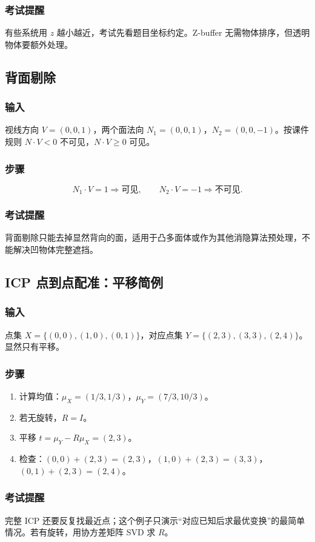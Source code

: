 \documentclass[UTF8,fontset=fandol,11pt]{ctexart}
\begin{document}
\subsubsection*{考试提醒}
有些系统用 $z$ 越小越近，考试先看题目坐标约定。Z-buffer 无需物体排序，但透明物体要额外处理。

\subsection{背面剔除}
\subsubsection*{输入}
视线方向 $V=(0,0,1)$，两个面法向 $N_1=(0,0,1)$，$N_2=(0,0,-1)$。按课件规则 $N\cdot V<0$ 不可见，$N\cdot V\ge0$ 可见。
\subsubsection*{步骤}
\[
N_1\cdot V=1\Rightarrow \text{可见},\qquad
N_2\cdot V=-1\Rightarrow \text{不可见}.
\]
\subsubsection*{考试提醒}
背面剔除只能去掉显然背向的面，适用于凸多面体或作为其他消隐算法预处理，不能解决凹物体完整遮挡。

\subsection{ICP 点到点配准：平移简例}
\subsubsection*{输入}
点集 $X=\{(0,0),(1,0),(0,1)\}$，对应点集 $Y=\{(2,3),(3,3),(2,4)\}$。显然只有平移。
\subsubsection*{步骤}
\begin{enumerate}
  \item 计算均值：$\mu_X=(1/3,1/3)$，$\mu_Y=(7/3,10/3)$。
  \item 若无旋转，$R=I$。
  \item 平移 $t=\mu_Y-R\mu_X=(2,3)$。
  \item 检查：$(0,0)+(2,3)=(2,3)$，$(1,0)+(2,3)=(3,3)$，$(0,1)+(2,3)=(2,4)$。
\end{enumerate}
\subsubsection*{考试提醒}
完整 ICP 还要反复找最近点；这个例子只演示“对应已知后求最优变换”的最简单情况。若有旋转，用协方差矩阵 SVD 求 $R$。
\end{document}
